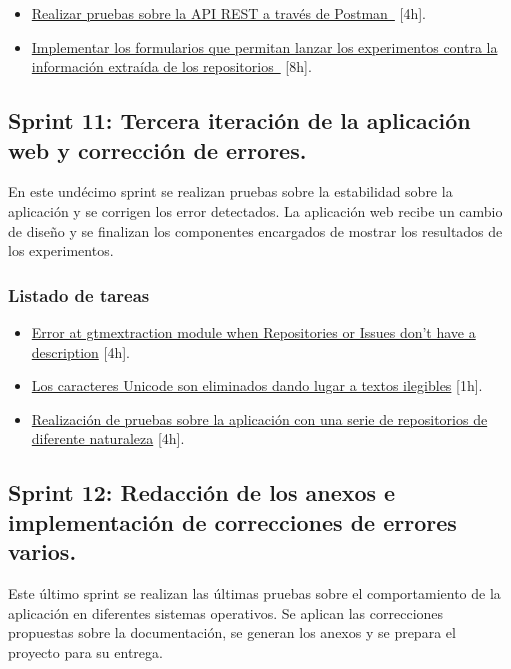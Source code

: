 \begin{itemize} \setlength\itemsep{0.2em}
    \item \href{https://github.com/MrpYA45/github-text-mining-tfg/issues/37}{Realizar pruebas sobre la API REST a través de Postman } [4h].
    \item \href{https://github.com/MrpYA45/github-text-mining-tfg/issues/38}{Implementar los formularios que permitan lanzar los experimentos contra la información extraída de los repositorios } [8h].
\end{itemize}

\subsection{Sprint 11: Tercera iteración de la aplicación web y corrección de errores.}

En este undécimo sprint se realizan pruebas sobre la estabilidad sobre la aplicación y se corrigen los error detectados. La aplicación web recibe un cambio de diseño y se finalizan los componentes encargados de mostrar los resultados de los experimentos.

\subsubsection{Listado de tareas}

\begin{itemize} \setlength\itemsep{0.2em}
    \item \href{https://github.com/MrpYA45/github-text-mining-tfg/issues/40}{Error at gtmextraction module when Repositories or Issues don't have a description} [4h].
    \item \href{https://github.com/MrpYA45/github-text-mining-tfg/issues/41}{Los caracteres Unicode son eliminados dando lugar a textos ilegibles} [1h].
    \item \href{https://github.com/MrpYA45/github-text-mining-tfg/issues/42}{Realización de pruebas sobre la aplicación con una serie de repositorios de diferente naturaleza} [4h].
\end{itemize}

\subsection{Sprint 12: Redacción de los anexos e implementación de correcciones de errores varios.}

Este último sprint se realizan las últimas pruebas sobre el comportamiento de la aplicación en diferentes sistemas operativos. Se aplican las correcciones propuestas sobre la documentación, se generan los anexos y se prepara el proyecto para su entrega.

